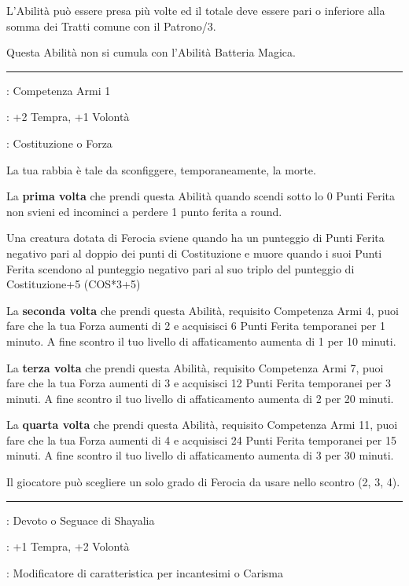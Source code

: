 \begin{multicols}{2}
L'Abilità può essere presa più volte ed il totale deve essere pari o inferiore alla somma dei Tratti comune con il Patrono/3.

Questa Abilità non si cumula con l'Abilità Batteria Magica.

\smallskip\noindent\rule{\linewidth}{2pt} \hypertarget{Ferocia}{}\medskip{}
\noindent
\begin{description}[noitemsep, topsep=0pt, parsep=0pt, partopsep=0pt, leftmargin=0cm, labelwidth=2.5cm]
    \item[\textbf{Requisito}]: Competenza Armi 1
    \item[\textbf{Tiri Salvezza}]: +2 Tempra, +1 Volontà
    \item[\textbf{Caratteristica}]: Costituzione o Forza
\end{description}

La tua rabbia è tale da sconfiggere, temporaneamente, la morte.

La \textbf{prima volta} che prendi questa Abilità quando scendi sotto lo 0 Punti Ferita non svieni ed incominci a perdere 1 punto ferita a round.

Una creatura dotata di Ferocia sviene quando ha un punteggio di Punti Ferita negativo pari al doppio dei punti di Costituzione e muore quando i suoi Punti Ferita scendono al punteggio negativo pari al suo triplo del punteggio di Costituzione+5 (COS*3+5)

La \textbf{seconda volta} che prendi questa Abilità, requisito Competenza Armi 4, puoi fare che la tua Forza aumenti di 2 e acquisisci 6 Punti Ferita temporanei per 1 minuto. A fine scontro il tuo livello di affaticamento aumenta di 1 per 10 minuti.

La \textbf{terza volta} che prendi questa Abilità, requisito Competenza Armi 7, puoi fare che la tua Forza aumenti di 3 e acquisisci 12 Punti Ferita temporanei per 3 minuti. A fine scontro il tuo livello di affaticamento aumenta di 2 per 20 minuti.

La \textbf{quarta volta} che prendi questa Abilità, requisito Competenza Armi 11, puoi fare che la tua Forza aumenti di 4 e acquisisci 24 Punti Ferita temporanei per 15 minuti. A fine scontro il tuo livello di affaticamento aumenta di 3 per 30 minuti.

Il giocatore può scegliere un solo grado di Ferocia da usare nello scontro (2, 3, 4).

\smallskip\noindent\rule{\linewidth}{2pt} \hypertarget{Figlia di Shayalia}{}\medskip{}
\noindent
\begin{description}[noitemsep, topsep=0pt, parsep=0pt, partopsep=0pt, leftmargin=0cm, labelwidth=2.5cm]
    \item[\textbf{Requisito}]: Devoto o Seguace di Shayalia
    \item[\textbf{Tiri Salvezza}]: +1 Tempra, +2 Volontà
    \item[\textbf{Caratteristica}]: Modificatore di caratteristica per incantesimi o Carisma
\end{description}


\end{multicols}
